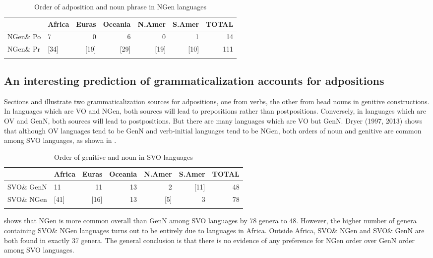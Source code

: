 \documentclass[output=paper]{langsci/langscibook}
\begin{document}
\begin{table}
\begin{tabularx}{\textwidth}{Xlrrrrr}
\lsptoprule
& \bfseries Africa & \bfseries Euras & \bfseries Oceania & \bfseries N.Amer & \bfseries S.Amer & \bfseries TOTAL\\
\midrule 
NGen\& Po & 7 & 0 & 6 & 0 & 1 & 14\\
NGen\& Pr & [34] & [19] & [29] & [19] & [10] & 111\\
\lspbottomrule
\end{tabularx}
\caption{\label{tab:dryer:4}Order of adposition and noun phrase in NGen languages}
\end{table}


\subsection{An interesting prediction of grammaticalization accounts for adpositions}\label{sec:dryer:2.3}


Sections  and  illustrate two grammaticalization sources for adpositions, one from verbs, the other from head nouns in genitive constructions. In languages which are VO and NGen, both sources will lead to prepositions rather than postpositions. Conversely, in languages which are OV and GenN, both sources will lead to postpositions. But there are many languages which are VO but GenN. Dryer (1997, 2013) shows that although OV languages tend to be GenN and verb-initial languages tend to be NGen, both orders of noun and genitive are common among SVO languages, as shown in .

\begin{table}
\begin{tabularx}{\textwidth}{Xlrrrrr} 
\lsptoprule
& \bfseries Africa & \bfseries Euras & \bfseries Oceania & \bfseries N.Amer & \bfseries S.Amer & \bfseries TOTAL\\
\midrule
SVO\& GenN & 11 & 11 & 13 & 2 & [11] & 48\\
SVO\& NGen & [41] & [16] & 13 & [5] & 3 & 78\\
\lspbottomrule
\end{tabularx}
\caption{\label{tab:dryer:5}Order of genitive and noun in SVO languages}
\end{table}


 shows that NGen is more common overall than GenN among SVO languages by 78 genera to 48. However, the higher number of genera containing SVO\& NGen languages turns out to be entirely due to languages in Africa. Outside Africa, SVO\& NGen and SVO\& GenN are both found in exactly 37 genera. The general conclusion is that there is no evidence of any preference for NGen order over GenN order among SVO languages.
\end{document}
